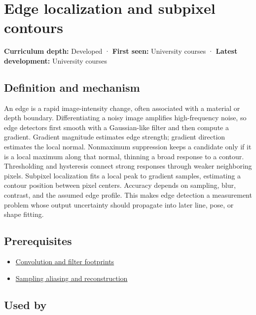 \hypertarget{appendix-36022286b03e}{}\label{referencestart:appendix-36022286b03e}
\section{Edge localization and subpixel contours}\label{appendix-36022286b03e-edge-localization-and-subpixel-contours}

\textbf{Curriculum depth:} Developed · \textbf{First seen:} University courses · \textbf{Latest development:} University courses

\subsection{Definition and mechanism}\label{appendix-36022286b03e-definition-and-mechanism}

An edge is a rapid image-intensity change, often associated with a material or depth boundary. Differentiating a noisy image amplifies high-frequency noise, so edge detectors first smooth with a Gaussian-like filter and then compute a gradient. Gradient magnitude estimates edge strength; gradient direction estimates the local normal. Nonmaximum suppression keeps a candidate only if it is a local maximum along that normal, thinning a broad response to a contour. Thresholding and hysteresis connect strong responses through weaker neighboring pixels. Subpixel localization fits a local peak to gradient samples, estimating a contour position between pixel centers. Accuracy depends on sampling, blur, contrast, and the assumed edge profile. This makes edge detection a measurement problem whose output uncertainty should propagate into later line, pose, or shape fitting.

\subsection{Prerequisites}\label{appendix-36022286b03e-prerequisites}

\begin{itemize}
\tightlist
\item
  \hyperref[appendix-d5b3c692d9f0]{Convolution and filter footprints}
\item
  \hyperref[appendix-6a7869dd79a6]{Sampling aliasing and reconstruction}
\end{itemize}

\subsection{Used by}\label{appendix-36022286b03e-used-by}


